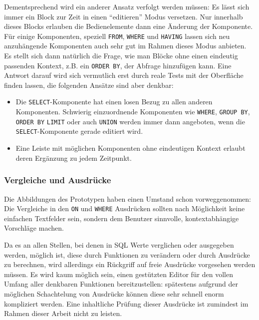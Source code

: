 \documentclass[paper=a4,fontsize=11pt,parskip=half]{scrartcl}
\begin{document}
Dementsprechend wird ein anderer Ansatz verfolgt werden müssen: Es lässt sich immer ein Block zur Zeit in einen ``editieren'' Modus versetzen. Nur innerhalb dieses Blocks erlauben die Bedienelemente dann eine Änderung der Komponente. Für einige Komponenten, speziell \texttt{FROM}, \texttt{WHERE} und \texttt{HAVING} lassen sich neu anzuhängende Komponenten auch sehr gut im Rahmen dieses Modus anbieten. Es stellt sich dann natürlich die Frage, wie man Blöcke ohne einen eindeutig passenden Kontext, z.B. ein \texttt{ORDER BY}, der Abfrage hinzufügen kann. Eine Antwort darauf wird sich vermutlich erst durch reale Tests mit der Oberfläche finden lassen, die folgenden Ansätze sind aber denkbar:

\begin{itemize}
  \item Die \texttt{SELECT}-Komponente hat einen losen Bezug zu allen anderen Komponenten. Schwierig einzuordnende Komponenten wie \texttt{WHERE}, \texttt{GROUP BY}, \texttt{ORDER BY} \texttt{LIMIT} oder auch \texttt{UNION} werden immer dann angeboten, wenn die \texttt{SELECT}-Komponente gerade editiert wird.
  \item Eine Leiste mit möglichen Komponenten ohne eindeutigen Kontext erlaubt deren Ergänzung zu jedem Zeitpunkt.
\end{itemize}


\subsubsection{Vergleiche und Ausdrücke}
\label{sec:sql-compare-and-expression}

Die Abbildungen des Prototypen haben einen Umstand schon vorweggenommen: Die Vergleiche in den \texttt{ON} und \texttt{WHERE} Ausdrücken sollten nach Möglichkeit keine einfachen Textfelder sein, sondern dem Benutzer sinnvolle, kontextabhängige Vorschläge machen.

Da es an allen Stellen, bei denen in SQL Werte verglichen oder ausgegeben werden, möglich ist, diese durch Funktionen zu verändern oder durch Ausdrücke zu berechnen, wird allerdings ein Rückgriff auf freie Ausdrücke vorgesehen werden müssen. Es wird kaum möglich sein, einen gestützten Editor für den vollen Umfang aller denkbaren Funktionen bereitzustellen: spätestens aufgrund der möglichen Schachtelung von Ausdrücke können diese sehr schnell enorm kompliziert werden. Eine inhaltliche Prüfung dieser Ausdrücke ist zumindest im Rahmen dieser Arbeit nicht zu leisten.
\end{document}
